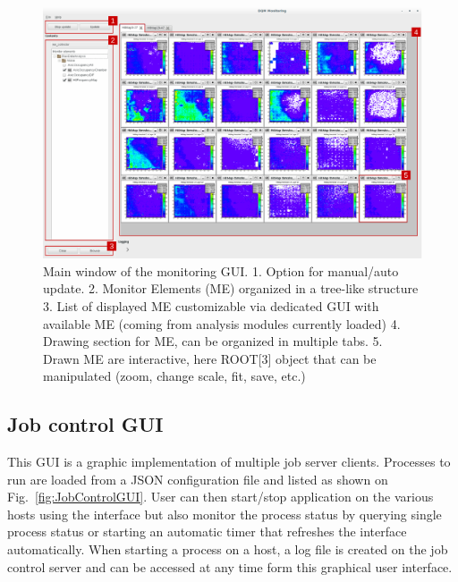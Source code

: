 \documentclass[conference]{IEEEtran}
\begin{document}
\begin{figure}[htbp]
  \begin{center}
    \includegraphics[width=.95\textwidth]{figs/MaintInterfaceGUI.pdf}
    \caption{\label{fig:DQMMainViz} Main window of the monitoring GUI.
    1. Option for manual/auto update.
    2. Monitor Elements (ME) organized in a tree-like structure
    3. List of displayed ME customizable via dedicated GUI with available ME (coming from analysis modules currently loaded)
    4. Drawing section for ME, can be organized in multiple tabs.
    5. Drawn ME are interactive, here ROOT[3] object that can be manipulated (zoom, change scale, fit, save, etc.)
    }
  \end{center}
\end{figure}

\subsection{Job control GUI}

This GUI is a graphic implementation of multiple job server clients. Processes to run are loaded from a JSON configuration file and listed as shown on Fig.~\ref{fig:JobControlGUI}. User can then start/stop application on the various hosts using the interface but also monitor the process status by querying single process status or starting an automatic timer that refreshes the interface automatically. When starting a process on a host, a log file is created on the job control server and can be accessed at any time form this graphical user interface.
\end{document}
